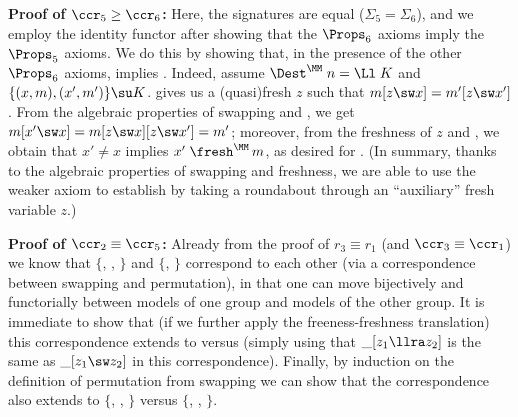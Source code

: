 %
\textbf{Proof of $\ccr_5 \geq \ccr_6$:}  
Here, the signatures are equal ($\Sigma_5 = \Sigma_6$), and we employ the identity functor 
after showing that the $\Props_6$  axioms imply the $\Props_5$ axioms. We do this by showing 
that, in the presence of the other $\Props_6$ axioms, \ISwCg{} implies \ISwBvr{}. 
Indeed, assume $\Dest^\MM\;n = \Ll\;K$ and $\{(x,m),(x',m')\} \su K$. 
%
\ISwCg{} gives us a (quasi)fresh $z$ such that $m[z\sw x] = m'[z\sw x']$.
From the algebraic properties of swapping and \ISwFr{},  
we get 
$m[x'\sw x] = m[z \sw x][z \sw x'] = m'$; 
moreover, from the freshness of $z$ and \IFrSw{}, we obtain that 
$x' \not= x$ implies $x'\;\fresh^\MM\, m$, as desired for \ISwBvr{}. 
(In summary, thanks to the algebraic properties of swapping and freshness, 
we are able to use the weaker axiom \ISwCg{} to establish \ISwBvr{} by taking a roundabout 
through an ``auxiliary'' fresh variable $z$.)
%

\textbf{Proof of $\ccr_2 \equiv \ccr_5$:}  Already from the proof of 
$r_3 \equiv r_1$ (and $\ccr_3 \equiv \ccr_1$) we know that $\{$\ISwId{}, \ISwIv{}, \ISwCp{}$\}$
 and $\{$\IPmId{}, \IPmCp{}$\}$ correspond to each other (via a correspondence between swapping and permutation), in that one can move bijectively and functorially between models of one group and models of the other group. 
%
It is immediate to show that (if we further apply the freeness-freshness translation) this correspondence extends to \ISwFr{} versus \IPmFv{} %
(simply using that $\_[z_1\llra z_2]$ is the same as $\_[z_1\sw z_2]$ in this correspondence). Finally, by induction on the definition of permutation from swapping we can show that the correspondence also extends to $\{$\ISwVr{}, \ISwAp{}, \ISwAp{}$\}$ versus $\{$\IPmVr{}, \IPmAp{}, \IPmAp{}$\}$. 



